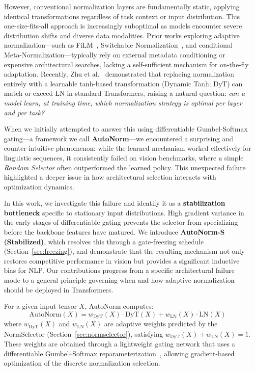 \documentclass[conference]{IEEEtran}
\begin{document}
However, conventional normalization layers are fundamentally static,
applying identical transformations regardless of task context or input
distribution. This one-size-fits-all approach is increasingly
suboptimal as models encounter severe distribution shifts and diverse
data modalities. Prior works exploring adaptive normalization---such
as FiLM~\cite{perez2018film}, Switchable
Normalization~\cite{luo2019switchable}, and conditional
Meta-Normalization---typically rely on external metadata conditioning
or expensive architectural searches, lacking a self-sufficient
mechanism for on-the-fly adaptation. Recently, Zhu et
al.~\cite{zhu2025transformers} demonstrated that replacing
normalization entirely with a learnable tanh-based transformation
(Dynamic Tanh; DyT) can match or exceed LN in standard Transformers,
raising a natural question: \textit{can a model learn, at training
time, which normalization strategy is optimal per layer and per task?}

When we initially attempted to answer this using differentiable
Gumbel-Softmax gating---a framework we call \textbf{AutoNorm}---we
encountered a surprising and counter-intuitive phenomenon: while the
learned mechanism worked effectively for linguistic sequences, it
consistently failed on vision benchmarks, where a simple \textit{Random
Selector} often outperformed the learned policy. This unexpected
failure highlighted a deeper issue in how architectural selection
interacts with optimization dynamics.

In this work, we investigate this failure and identify it as a
\textbf{stabilization bottleneck} specific to stationary input
distributions. High gradient variance in the early stages of
differentiable gating prevents the selector from specializing before
the backbone features have matured. We introduce \textbf{AutoNorm-S
(Stabilized)}, which resolves this through a gate-freezing schedule
(Section~\ref{sec:freezing}), and demonstrate that the resulting
mechanism not only restores competitive performance in vision but
provides a significant inductive bias for NLP. Our contributions
progress from a specific architectural failure mode to a general
principle governing when and how adaptive normalization should be
deployed in Transformers.

For a given input tensor $X$, AutoNorm computes:
\begin{equation}
  \text{AutoNorm}(X) = w_{\text{DyT}}(X) \cdot \text{DyT}(X)
                     + w_{\text{LN}}(X)  \cdot \text{LN}(X)
  \label{eq:autonorm}
\end{equation}
where $w_{\text{DyT}}(X)$ and $w_{\text{LN}}(X)$ are adaptive weights
predicted by the NormSelector (Section~\ref{sec:normselector}),
satisfying $w_{\text{DyT}}(X) + w_{\text{LN}}(X) = 1$. These weights
are obtained through a lightweight gating network that uses a
differentiable Gumbel--Softmax
reparameterization~\cite{jang2017gumbelsoftmax}, allowing
gradient-based optimization of the discrete normalization selection.
\end{document}
